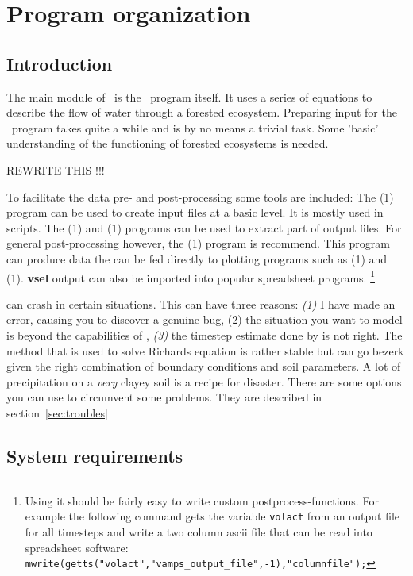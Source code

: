 \chapter{Program organization}

\section{Introduction}
The main module of \vamps\ is the \vamps\ program itself. It uses a
series of equations to describe the flow of water through a forested
ecosystem.  Preparing input for the \vamps\ program takes quite a
while and is by no means a trivial task. Some 'basic' understanding of
the functioning of forested ecosystems is needed.

REWRITE THIS !!!

To facilitate the data pre- and post-processing some tools are
included: The {\bf {}}(1) program can be used to create
input files at a basic level.  It is mostly used in scripts. The {\bf
{}}(1) and {\bf {}}(1) programs can be used to
extract part of output files. For general post-processing however, the
{\bf {}}(1) program is recommend.  This program can produce
data the can be fed directly to plotting programs such as {\bf
{}}(1) and {\bf {}}(1). {\bf vsel} output can
also be imported into popular spreadsheet programs.
\footnote{Using \slang{} it should be fairly easy to write custom
postprocess-functions. For example the following command gets the
variable {\tt volact} from an output file for all timesteps and
write a two column ascii file that can be read into spreadsheet
software: {\tt mwrite(getts("volact","vamps\_output\_file",-1),"columnfile");}
}

\vamps{} can crash in certain situations. This can have three reasons: {\em
(1)} I have made an error, causing you to discover a genuine bug, (2)
the situation you want to model is beyond the capabilities of \vamps{},
{\em (3)} the timestep estimate done by \vamps{} is not right. The
method that is used to solve Richards equation is rather stable but can
go bezerk given the right combination of boundary conditions and soil
parameters. A lot of precipitation on a {\em very} clayey soil is a
recipe for disaster.  There are some options you can use to circumvent
some problems. They are described in section~\ref{sec:troubles}


\section{System requirements}

